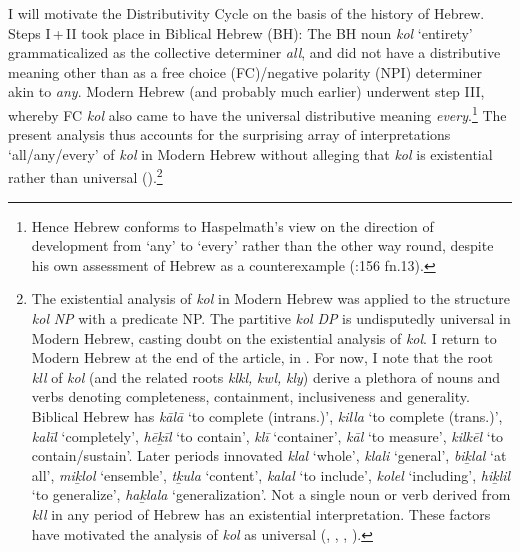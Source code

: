 \documentclass[output=paper]{langsci/langscibook}
\begin{document}
I will motivate the Distributivity Cycle on the basis of the history of Hebrew. Steps I\,+\,II took place in Biblical Hebrew (BH): The BH noun \textit{kol} ‘entirety’ grammaticalized as the collective determiner \textit{all}, and did not have a distributive meaning other than as a free choice (FC)\slash negative polarity (NPI) determiner akin to \textit{any}. Modern Hebrew (and probably much earlier) underwent step III, whereby FC \textit{kol} also came to have the universal distributive meaning \textit{every}.\footnote{Hence Hebrew conforms to Haspelmath’s view on the direction of development from ‘any’ to ‘every’ rather than the other way round, despite his own assessment of Hebrew as a counterexample (\citealt{Haspelmath1997}:156 fn.13).}  The present analysis thus accounts for the surprising array of interpretations ‘all\slash any\slash every’ of \textit{kol} in Modern Hebrew without alleging that \textit{kol} is existential rather than universal (\citealt{LevMargulis2013}).\footnote{The existential analysis of \textit{kol} in Modern Hebrew was applied to the structure \textit{kol} \textit{NP} with a predicate NP. The partitive \textit{kol} \textit{DP} is undisputedly universal in Modern Hebrew, casting doubt on the existential analysis of \textit{kol}. I return to Modern Hebrew at the end of the article, in . For now, I note that the root \textit{kll} of \textit{kol} (and the related roots \textit{klkl,} \textit{kwl,} \textit{kly}) derive a plethora of nouns and verbs denoting completeness, containment, inclusiveness and generality. Biblical Hebrew has \textit{kālā} ‘to complete (intrans.)’, \textit{killa} ‘to complete (trans.)’, \textit{kalīl} ‘completely’, \textit{hēḵīl} ‘to contain’, \textit{klī} ‘container’, \textit{kāl} ‘to measure’, \textit{kilkēl} ‘to contain\slash sustain’. Later periods innovated \textit{klal} ‘whole’, \textit{klali} ‘general’, \textit{biḵlal} ‘at all’, \textit{miḵlol} ‘ensemble’, \textit{tḵula} ‘content’, \textit{kalal} ‘to include’, \textit{kolel} ‘including’, \textit{hiḵlil} ‘to generalize’, \textit{haḵlala} ‘generalization’. Not a single noun or verb derived from \textit{kll} in any period of Hebrew has an existential interpretation. These factors have motivated the analysis of \textit{kol} as universal (\citealt{DoronMittwoch1986}, \citealt{Glinert1989}, \citealt{FrancezGoldring2012}, \citealt{Danon2013}).}\largerpage
\end{document}
